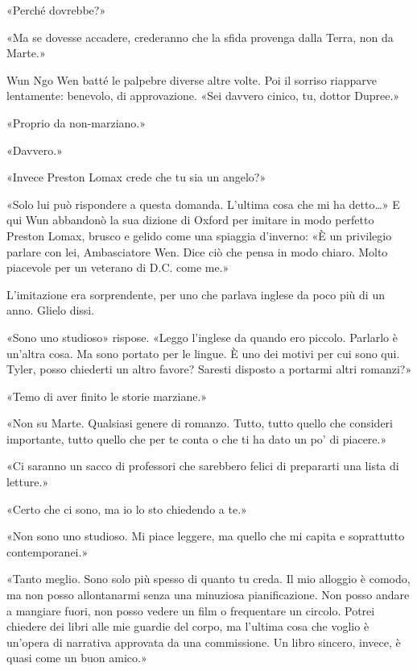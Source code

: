 «Perché dovrebbe?»

«Ma se dovesse accadere, crederanno che la sfida provenga dalla Terra,
non da Marte.»

Wun Ngo Wen batté le palpebre diverse altre volte. Poi il sorriso
riapparve lentamente: benevolo, di approvazione. «Sei davvero cinico,
tu, dottor Dupree.»

«Proprio da non-marziano.»

«Davvero.»

«Invece Preston Lomax crede che tu sia un angelo?»

«Solo lui può rispondere a questa domanda. L'ultima cosa che mi ha
detto\ldots» E qui Wun abbandonò la sua dizione di Oxford per imitare in
modo perfetto Preston Lomax, brusco e gelido come una spiaggia
d'inverno: «È un privilegio parlare con lei, Ambasciatore Wen. Dice ciò
che pensa in modo chiaro. Molto piacevole per un veterano di D.C. come
me.»

L'imitazione era sorprendente, per uno che parlava inglese da poco più
di un anno. Glielo dissi.

«Sono uno studioso» rispose. «Leggo l'inglese da quando ero piccolo.
Parlarlo è un'altra cosa. Ma sono portato per le lingue. È uno dei
motivi per cui sono qui. Tyler, posso chiederti un altro favore? Saresti
disposto a portarmi altri romanzi?»

«Temo di aver finito le storie marziane.»

«Non su Marte. Qualsiasi genere di romanzo. Tutto, tutto quello che
consideri importante, tutto quello che per te conta o che ti ha dato un
po' di piacere.»

«Ci saranno un sacco di professori che sarebbero felici di prepararti
una lista di letture.»

«Certo che ci sono, ma io lo sto chiedendo a te.»

«Non sono uno studioso. Mi piace leggere, ma quello che mi capita e
soprattutto contemporanei.»

«Tanto meglio. Sono solo più spesso di quanto tu creda. Il mio alloggio
è comodo, ma non posso allontanarmi senza una minuziosa pianificazione.
Non posso andare a mangiare fuori, non posso vedere un film o
frequentare un circolo. Potrei chiedere dei libri alle mie guardie del
corpo, ma l'ultima cosa che voglio è un'opera di narrativa approvata da
una commissione. Un libro sincero, invece, è quasi come un buon amico.»

